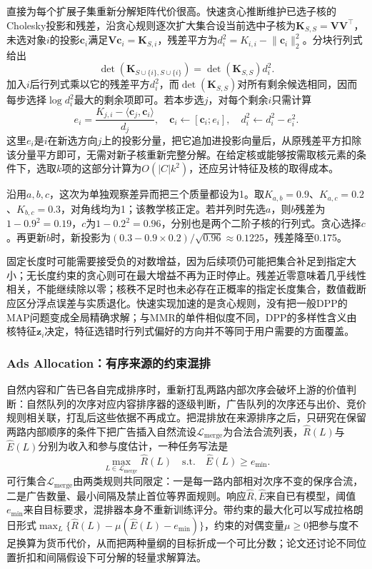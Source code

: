 直接为每个扩展子集重新分解矩阵代价很高。快速贪心推断维护已选子核的Cholesky投影和残差，沿贪心规则逐次扩大集合设当前选中子核为$\bm K_{S,S}=\bm V\bm V^\top$，未选对象$i$的投影$\bm c_i$满足$\bm V\bm c_i=\bm K_{S,i}$，残差平方为$d_i^2=K_{i,i}-\lVert\bm c_i\rVert_2^2$。分块行列式给出
\[
 \det(\bm K_{S\cup\{i\},S\cup\{i\}})
 =\det(\bm K_{S,S})d_i^2.
\]
加入$i$后行列式乘以它的残差平方$d_i^2$，而$\det(\bm K_{S,S})$对所有剩余候选相同，因而每步选择$\log d_i^2$最大的剩余项即可。若本步选$j$，对每个剩余$i$只需计算
\begin{equation}
 e_i=\frac{K_{j,i}-\langle\bm c_j,\bm c_i\rangle}{d_j},
 \quad
 \bm c_i\leftarrow[\bm c_i;e_i],
 \quad
 d_i^2\leftarrow d_i^2-e_i^2.
 \label{eq:rs-dpp-update}
\end{equation}
这里$e_i$是$i$在新选方向$j$上的投影分量，把它追加进投影向量后，从原残差平方扣除该分量平方即可，无需对新子核重新完整分解。在给定核或能够按需取核元素的条件下，选取$k$项的这部分计算为$O(|C|k^2)$，还应另计特征及核的取得成本。

沿用$a,b,c$，这次为单独观察差异而把三个质量都设为1。取$K_{a,b}=0.9$、$K_{a,c}=0.2$、$K_{b,c}=0.3$，对角线均为1；该教学核正定。若并列时先选$a$，则$b$残差为$1-0.9^2=0.19$，$c$为$1-0.2^2=0.96$，分别也是两个二阶子核的行列式。贪心选择$c$。再更新$b$时，新投影为$(0.3-0.9\times0.2)/\sqrt{0.96}\approx0.1225$，残差降至0.175。

固定长度时可能需要接受负的对数增益，因为后续项仍可能把集合补足到指定大小；无长度约束的贪心则可在最大增益不再为正时停止。残差近零意味着几乎线性相关，不能继续除以零；核秩不足时也未必存在正概率的指定长度集合，数值截断应区分浮点误差与实质退化。快速实现加速的是贪心规则，没有把一般DPP的MAP问题变成全局精确求解；与MMR的单件相似度不同，DPP的多样性含义由核特征$\bm z_i$决定，特征选错时行列式偏好的方向并不等同于用户需要的方面覆盖。

\subsubsection{Ads Allocation：有序来源的约束混排}
\label{sec:rs-ads-allocation}

自然内容和广告已各自完成排序时，重新打乱两路内部次序会破坏上游的价值判断：自然队列的次序对应内容排序器的逐级判断，广告队列的次序还与出价、竞价规则相关联，打乱后这些依据不再成立。把混排放在来源排序之后，只研究在保留两路内部顺序的条件下把广告插入自然流设$\mathcal L_{\mathrm{merge}}$为合法合流列表，$\widehat R(L)$与$\widehat E(L)$分别为收入和参与度估计，一种任务写法是
\begin{equation}
 \max_{L\in\mathcal L_{\mathrm{merge}}}\widehat R(L)
 \quad\text{s.t.}\quad \widehat E(L)\geq e_{\min}.
 \label{eq:rs-ads-allocation}
\end{equation}
可行集合$\mathcal L_{\mathrm{merge}}$由两类规则共同限定：一是每一路内部相对次序不变的保序合流，二是广告数量、最小间隔及禁止首位等界面规则。响应$\widehat R,\widehat E$来自已有模型，阈值$e_{\min}$来自目标要求，混排器本身不重新训练评分。带约束的最大化可以写成拉格朗日形式$\max_L\{\widehat R(L)-\mu(\widehat E(L)-e_{\min})\}$，约束的对偶变量$\mu\geq0$把参与度不足换算为货币代价，从而把两种量纲的目标折成一个可比分数；论文还讨论不同位置折扣和间隔假设下可分解的轻量求解算法。

